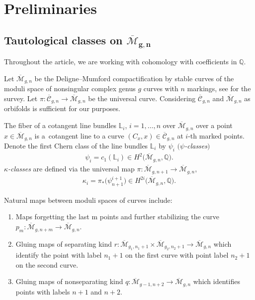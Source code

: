 \documentclass[10pt,a4paper]{amsart}
\def\oM{\overline{\mathcal{M}}}
\numberwithin{equation}{section}
\begin{document}
\section{Preliminaries}
\subsection[Tautological classes on M\_\{g,n\}]{Tautological classes on $\boldsymbol{\oM_{g,n}}$}

Throughout the article, we are working with cohomology with coefficients in $\mathbb{Q}$.

Let $\oM_{g,n}$ be the Deligne--Mumford compactification by stable curves of the moduli space of nonsingular complex genus $g$ curves with $n$ markings, see \cite{Z} for the survey. Let
$
\pi\colon \overline{\mathcal{C}}_{g,n} \to \overline{\mathcal{M}}_{g,n}
$
be the universal curve. Considering $\overline{\mathcal{C}}_{g,n}$ and $\overline{\mathcal{M}}_{g,n}$ as orbifolds is sufficient for our purposes.

The fiber of a cotangent line bundles $\mathbb{L}_i$, $i=1,\dots,n$ over $\oM_{g,n}$ over a point $x \in \oM_{g,n}$ is a~cotangent line to a curve $(C_x,x)\in \overline{\mathcal{C}}_{g,n}$ at $i$-th marked points.
Denote the first Chern class of the line bundles $\mathbb{L}_i$ by $\psi_i$ {$($\em $\psi$-classes$)$}
\begin{align*}
\psi_i = c_1(\mathbb{L}_i)\in H^2\big(\oM_{g,n},\mathbb{Q}\big).
\end{align*}
{\em $\kappa$-classes} are defined via the universal map $\pi\colon \oM_{g,n+1} \to \oM_{g,n}$,
\begin{align*}
\kappa_i = \pi_{*}\big(\psi^{i+1}_{n+1}\big)\in H^{2i}\big(\oM_{g,n},\mathbb{Q}\big).
\end{align*}

Natural maps between moduli spaces of curves include:
\begin{enumerate}\itemsep=0pt
\item[(i)] Maps forgetting the last m points and further stabilizing the curve
$
p_m \colon \oM_{g, n+m} \to \oM_{g,n}$.
\item[(ii)] Gluing maps of separating kind
$
r\colon \oM_{g_1, n_1+1} \times \oM_{g_2, n_2+1} \to \oM_{g,n}$
which identify the point with label $n_1+1$ on the first curve with point label $n_2+1$ on the second curve.

\item[(iii)] Gluing maps of nonseparating kind
$
q \colon \oM_{g-1, n+2} \to \oM_{g,n}$
which identifies points with labels $n+1$ and $n+2$.
\end{enumerate}
\end{document}
